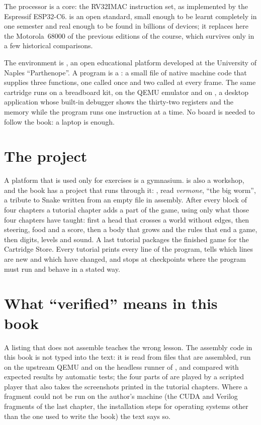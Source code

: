 The processor is a \riscv core: the RV32IMAC instruction set, as implemented by
the Espressif ESP32\nobreakdash-C6. \riscv is an open standard, small enough
to be learnt completely in one semester and real enough to be found in
billions of devices; it replaces here the Motorola~68000 of the previous
editions of the course, which survives only in a few historical comparisons.

The environment is \prg, an open educational platform developed at the
University of Naples ``Parthenope''. A \prg program is a : a
small file of native machine code that supplies three functions, one called
once and two called at every frame. The same cartridge runs on a breadboard
kit, on the QEMU emulator and on \prgqt, a desktop application whose built-in
debugger shows the thirty-two registers and the memory while the program runs
one instruction at a time. No board is needed to follow the book: a laptop is
enough.

\section*{The project}

A platform that is used only for exercises is a gymnasium. \prg is also a
workshop, and the book has a project that runs through it: \vermone, read
\emph{vermone}, ``the big worm'', a tribute to Snake written from an empty file
in \riscv assembly. After every block of four chapters a tutorial chapter adds
a part of the game, using only what those four chapters have taught: first a
head that crosses a world without edges, then steering, food and a score, then
a body that grows and the rules that end a game, then digits, levels and
sound. A last tutorial packages the finished game for the \prg Cartridge
Store. Every tutorial prints every line of the program, tells which lines are
new and which have changed, and stops at checkpoints where the program must
run and behave in a stated way.

\section*{What ``verified'' means in this book}

A listing that does not assemble teaches the wrong lesson. The assembly code
in this book is not typed into the text: it is read from files that are
assembled, run on the upstream QEMU and on the headless runner of \prgqt, and
compared with expected results by automatic tests; the four parts of \vermone
are played by a scripted player that also takes the screenshots printed in the
tutorial chapters. Where a fragment could not be run on the author's machine
(the CUDA and Verilog fragments of the last chapter, the installation steps for
operating systems other than the one used to write the book) the text says so.

